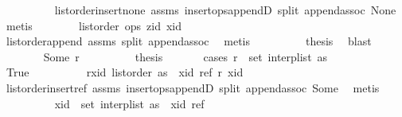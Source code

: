 \begin{isabellebody}
\ \ \ \ \ \ \ \ \isamarkupfalse%
\ list{\isacharunderscore}order{\isacharunderscore}insert{\isacharunderscore}none\ assms{\isacharparenleft}{}{\isacharparenright}\ insert{\isacharunderscore}ops{\isacharunderscore}appendD\ split\ append{\isachardot}assoc\ None\ \isamarkupfalse%
\ metis\isanewline
\ \ \ \ \ \ \isamarkupfalse%
\ {\isachardoublequoteopen}list{\isacharunderscore}order\ ops\ zid\ xid{\isachardoublequoteclose}\isanewline
\ \ \ \ \ \ \ \ \isamarkupfalse%
\ list{\isacharunderscore}order{\isacharunderscore}append\ assms{\isacharparenleft}{}{\isacharparenright}\ split\ append{\isachardot}assoc\ \isamarkupfalse%
\ metis\isanewline
\ \ \ \ \ \ \isamarkupfalse%
\ \isamarkupfalse%
\ {\isacharquery}thesis\ \isamarkupfalse%
\ blast\isanewline
\ \ \ \ \isamarkupfalse%
\isanewline
\ \ \ \ \ \ \isamarkupfalse%
\ {\isacharparenleft}Some\ r{\isacharparenright}\isanewline
\ \ \ \ \ \ \isamarkupfalse%
\ \isamarkupfalse%
\ {\isacharquery}thesis\isanewline
\ \ \ \ \ \ \isamarkupfalse%
{\isacharparenleft}cases\ {\isachardoublequoteopen}r\ {\isasymin}\ set\ {\isacharparenleft}interp{\isacharunderscore}list\ as{\isacharparenright}{\isachardoublequoteclose}{\isacharparenright}\isanewline
\ \ \ \ \ \ \ \ \isamarkupfalse%
\ True\isanewline
\ \ \ \ \ \ \ \ \isamarkupfalse%
\ r{\isacharunderscore}xid{\isacharcolon}\ {\isachardoublequoteopen}list{\isacharunderscore}order\ {\isacharparenleft}as\ {\isacharat}\ {\isacharbrackleft}{\isacharparenleft}xid{\isacharcomma}\ ref{\isacharparenright}{\isacharbrackright}{\isacharparenright}\ r\ xid{\isachardoublequoteclose}\isanewline
\ \ \ \ \ \ \ \ \ \ \isamarkupfalse%
\ list{\isacharunderscore}order{\isacharunderscore}insert{\isacharunderscore}ref\ assms{\isacharparenleft}{}{\isacharparenright}\ insert{\isacharunderscore}ops{\isacharunderscore}appendD\ split\ append{\isachardot}assoc\ Some\ \isamarkupfalse%
\ metis\isanewline
\ \ \ \ \ \ \ \ \isamarkupfalse%
\ {\isachardoublequoteopen}xid\ {\isasymin}\ set\ {\isacharparenleft}interp{\isacharunderscore}list\ {\isacharparenleft}as\ {\isacharat}\ {\isacharbrackleft}{\isacharparenleft}xid{\isacharcomma}\ ref{\isacharparenright}{\isacharbrackright}{\isacharparenright}{\isacharparenright}{\isachardoublequoteclose}\isanewline
\ \ \ \ \ \ \ \ \ \ \isamarkupfalse%

\end{isabellebody}

